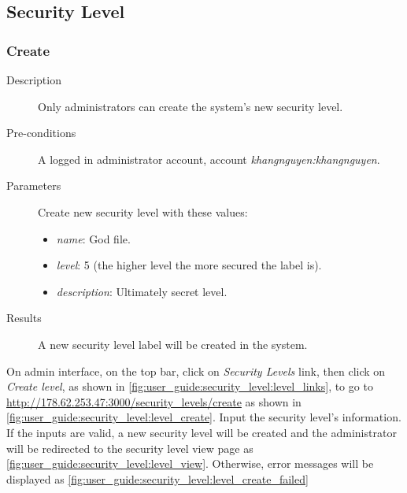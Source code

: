 \subsection{Security Level}
\label{ch:appendix-a:user_guide:security_level}
\subsubsection{Create}
\label{ch:appendix-a:user_guide:security_level:create}

\begin{description}
\item[Description] Only administrators can create the system's new security level.
\item[Pre-conditions] A logged in administrator account, \eg account \emph{khangnguyen:khangnguyen}.
\item[Parameters] Create new security level with these values:
\begin{itemize}
\item \emph{name}: God file.
\item \emph{level}: 5 (the higher level the more secured the label is).
\item \emph{description}: Ultimately secret level.
\end{itemize}
\item[Results] A new security level label will be created in the system.
\end{description}

On admin interface, on the top bar, click on \emph{Security Levels} link, then click on \emph{Create level}, as shown in \autoref{fig:user_guide:security_level:level_links}, 
to go to \href{http://178.62.253.47:3000/security\_levels/create}{http://178.62.253.47:3000/security\_levels/create} as shown in \autoref{fig:user_guide:security_level:level_create}.
Input the security level's information.
If the inputs are valid, a new security level will be created and the administrator will be redirected to the security level view page as \autoref{fig:user_guide:security_level:level_view}.
Otherwise, error messages will be displayed as \autoref{fig:user_guide:security_level:level_create_failed}

